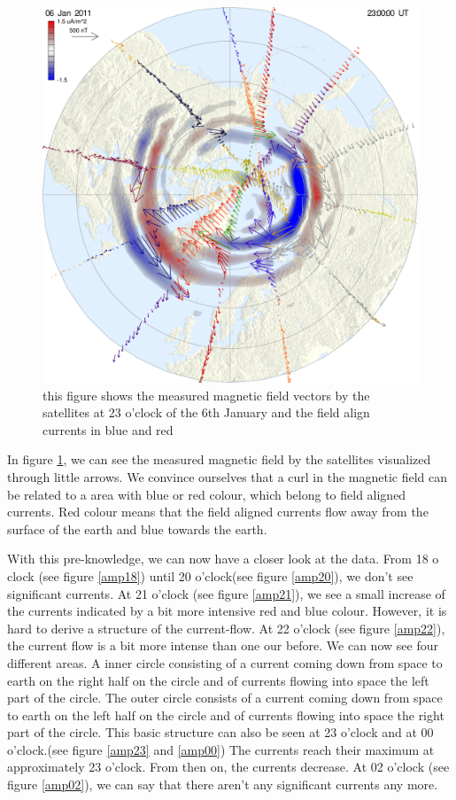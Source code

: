 \documentclass[10pt,a4paper]{article}
\begin{document}
\begin{figure}[h]
\centering
\includegraphics[scale=0.3]{summary_better_exp.pdf}
\caption{this figure shows the measured magnetic field vectors by the satellites at 23 o'clock of the 6th January and the field align currents in blue and red}
\label{AMPERE_explonation}
\end{figure}
In figure \ref{AMPERE_explonation}, we can see the measured magnetic field by the satellites visualized through little arrows. We convince ourselves that a curl in the magnetic field can be related to a area with blue or red colour, which belong to field aligned currents. Red colour means that the field aligned currents flow away from the surface of the earth and blue towards the earth. 


With this pre-knowledge, we can now have a closer look at the data.
From 18 o clock (see figure \ref{amp18}) until 20 o'clock(see figure \ref{amp20}), we don't see significant currents. 
At 21 o'clock (see figure \ref{amp21}), we see a small increase of the currents indicated by a bit more intensive red and blue colour. However, it is hard to derive a structure of the current-flow.
At 22 o'clock (see figure \ref{amp22}), the current flow is a bit more intense than one our before. We can now see four different areas. A inner circle consisting of a current coming down from space to earth on the right half on the circle and of currents flowing into space the left part of the circle. 
The outer circle consists of a current coming down from space to earth on the left half on the circle and of currents flowing into space the right part of the circle.
This basic structure can also be seen at 23 o'clock and at 00 o'clock.(see figure \ref{amp23} and \ref{amp00}) The currents reach their maximum at approximately 23 o'clock. From then on, the currents decrease. At 02 o'clock (see figure \ref{amp02}), we can say that there aren't any significant currents any more. 
\end{document}
